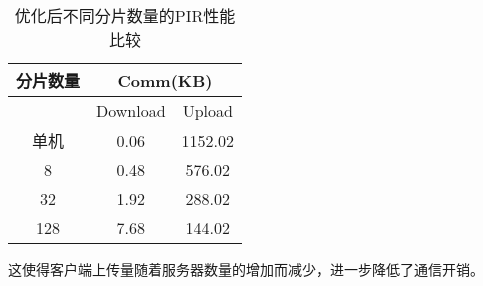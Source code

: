 \begin{table}[]
    \caption{优化后不同分片数量的PIR性能比较}
    \label{tab:sharded-scheme-optimized}
    \centering
    \begin{tabular}{@{}c|cc@{}}
    \toprule
    分片数量 & \multicolumn{2}{c}{Comm(KB)} \\ \midrule
         & Download      & Upload       \\ \midrule
    单机   & 0.06          & 1152.02      \\
    8    & 0.48          & 576.02       \\
    32   & 1.92          & 288.02       \\
    128  & 7.68          & 144.02       \\ \bottomrule
    \end{tabular}
\end{table}

这使得客户端上传量随着服务器数量的增加而减少，进一步降低了通信开销。